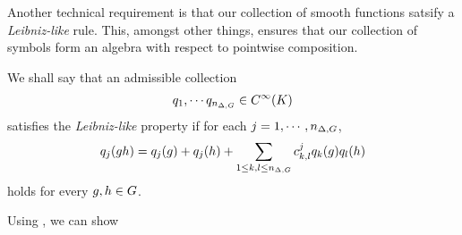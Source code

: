 Another technical requirement is that our collection of smooth functions satsify a \emph{Leibniz-like} rule.
This, amongst other things, ensures that our collection of symbols form an algebra with respect to pointwise composition.

\begin{definition}
\label{definition:Leibniz-like_property_for_smooth_functions}
    We shall say that an admissible collection
    \begin{align*}
        q_1, \cdots q_{n_{\Delta, G}} \in {C^\infty(K)}
    \end{align*}
    satisfies the \emph{Leibniz-like} property
    if for each $j = 1, \cdots, n_{\Delta, G}$,
    \begin{align*}
        q_j(g h) = q_j(g) + q_j(h) + \sum_{1 \leq k, l \leq n_{\Delta, G}} c^j_{k, l} q_k(g) q_l(h)
    \end{align*}
    holds for every $g, h \in G$.
\end{definition}

Using \cite[Lemma 4.4]{RuzhanskyTurunenWirth10}, we can show

